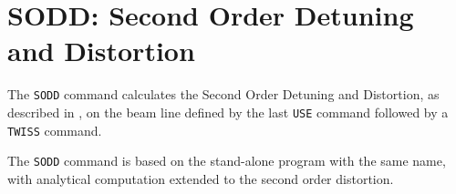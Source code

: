 
\chapter{SODD: Second Order Detuning and Distortion}

The \texttt{SODD} command calculates the Second Order Detuning and
Distortion, as described in \cite{bengtsson1990}, on the beam line
defined by the last \texttt{USE} command followed by a \texttt{TWISS}
command. 

The \texttt{SODD} command is based on the stand-alone program\cite{SODD}
with the same name, with analytical computation extended to the second
order distortion\cite{schmidt1999}. 


